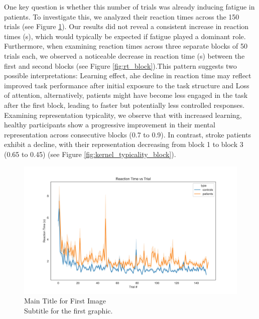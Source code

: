 One key question is whether this number of trials was already inducing fatigue in patients. To investigate this, we analyzed their reaction times across the 150 trials (see Figure \ref{fig:rt_clinical}). Our results did not reveal a consistent increase in reaction times (s), which would typically be expected if fatigue played a dominant role. Furthermore, when examining reaction times across three separate blocks of 50 trials each, we observed a noticeable decrease in reaction time (s) between the first and second blocks (see Figure \ref{fig:rt_block}).This pattern suggests two possible interpretations: Learning effect, ahe decline in reaction time may reflect improved task performance after initial exposure to the task structure and Loss of attention, alternatively, patients might have become less engaged in the task after the first block, leading to faster but potentially less controlled responses. Examining representation typicality, we observe that with increased learning, healthy participants show a progressive improvement in their mental representation across consecutive blocks (0.7 to 0.9). In contrast, stroke patients exhibit a decline, with their representation decreasing from block 1 to block 3 (0.65 to 0.45) (see Figure \ref{fig:kernel_typicality_block}).
\begin{figure}[H]
    \centering
    \includegraphics[width=15cm]{MainLayout/Images/chapter5/rt_clinical.jpg}
    \caption{Main Title for First Image \\ \small Subtitle for the first graphic.}
    \label{fig:rt_clinical}
\end{figure}

